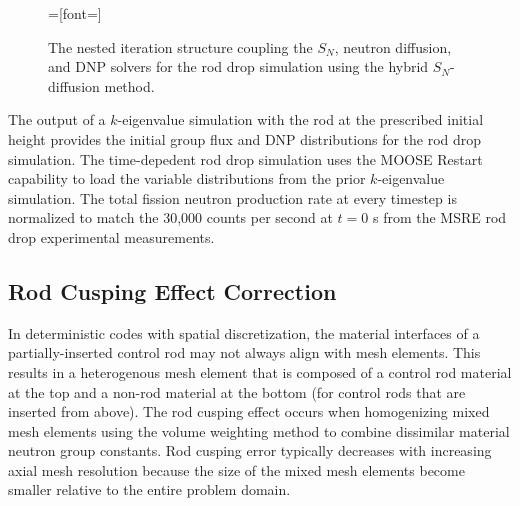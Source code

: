 \begin{figure}[t]
  =[font=\small]
  \centering
  \caption{The nested iteration structure coupling the $S_N$, neutron diffusion, and \gls{DNP}
  solvers for the rod drop simulation using the hybrid $S_N$-diffusion method.}
  \label{fig:rod-drop-coupling}
\end{figure}

The output of a $k$-eigenvalue simulation with the rod at the prescribed initial height provides
the initial group flux and \gls{DNP} distributions for the rod drop simulation. The time-depedent
rod drop simulation uses the \gls{MOOSE} Restart capability to load the variable distributions from
the prior $k$-eigenvalue simulation. The total fission neutron production rate at every timestep
is normalized to match the 30,000 counts per second at $t=0$ s from the \gls{MSRE} rod drop
experimental measurements.

\subsection{Rod Cusping Effect Correction}

In deterministic codes with spatial discretization, the material interfaces of a partially-inserted
control rod may not always align with mesh elements. This results in a heterogenous
mesh element that is composed of a control rod material at the top and a non-rod material at the
bottom (for control rods that are inserted from above). The rod cusping effect occurs when
homogenizing mixed mesh elements using the volume weighting method to combine dissimilar material
neutron group constants. Rod cusping error typically decreases with increasing axial mesh
resolution because the size of the mixed mesh elements become smaller relative to the entire
problem domain.

